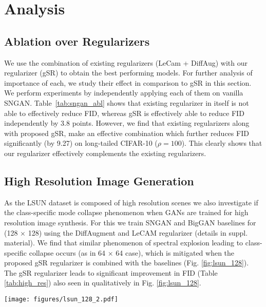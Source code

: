 \documentclass[runningheads,table]{llncs}
\begin{document}
\section{Analysis}
\subsection{Ablation over Regularizers}
We use the combination of existing regularizers (LeCam + DiffAug) with our regularizer (gSR) to obtain the best performing models. For further analysis of importance of each, we study their effect in comparison to gSR in this section. We perform experiments by independently applying each of them on vanilla SNGAN. Table~\ref{tab:sngan_abl} shows that existing regularizer in itself is not able to effectively reduce FID, whereas gSR is effectively able to reduce FID independently by 3.8 points. However, we find that existing regularizers along with proposed gSR, make an effective combination which further reduces FID significantly (by 9.27) on long-tailed CIFAR-10 ($\rho = 100$). This clearly shows that our regularizer effectively complements the existing regularizers.
\subsection{High Resolution Image Generation} 
As the LSUN dataset is composed of high resolution scenes we also investigate if the class-specific mode collapse phenomenon when GANs are trained for high resolution image synthesis. For this we train SNGAN and BigGAN baselines for (128 $\times$ 128) using the DiffAugment and LeCAM regularizer (details in suppl. material). We find that similar phenomenon of spectral explosion leading to class-specific collapse occurs (as in 64 $\times$ 64 case), which is mitigated when the proposed gSR regularizer is combined with the baselines (Fig. \ref{fig:lsun_128}). The gSR regularizer leads to significant improvement in FID (Table \ref{tab:high_res}) also seen in qualitatively in Fig. \ref{fig:lsun_128}.
\begin{figure*}[t]    
    \centering
    \texttt{[image: figures/lsun\_128\_2.pdf]}
    \caption{\textbf{Qualitative comparison of BigGAN variants on LSUN dataset ($\rho$=100) (128 $\times$ 128).} Each row represents images from a distinct class. }
    \label{fig:lsun_128}
\end{figure*}
\end{document}
